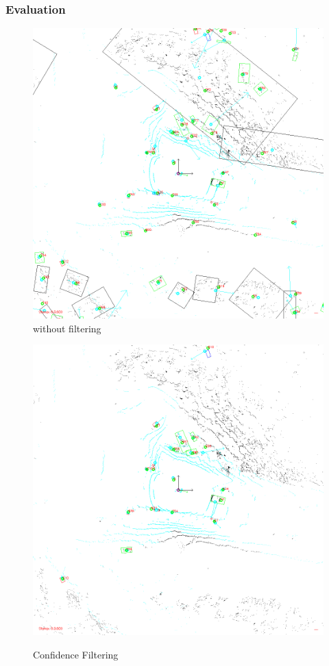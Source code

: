 \documentclass[nosymbols]{beamer}	%
\begin{document}
\begin{frame}
\frametitle{Evaluation}
\begin{figure}[htb]
  \caption{Confidence Filtering} 
    \centering
    \begin{minipage}[t]{0.49\textwidth}
        \centering
          \includegraphics[width=\textwidth]{bilder/filter_off.png}\\
          without filtering
    \end{minipage}%
    \hfill
    \begin{minipage}[t]{0.49\textwidth}
        \centering
	\includegraphics[width=\textwidth]{bilder/filter_on.png}\\

\end{minipage}
\end{figure}
\end{frame}
\end{document}
